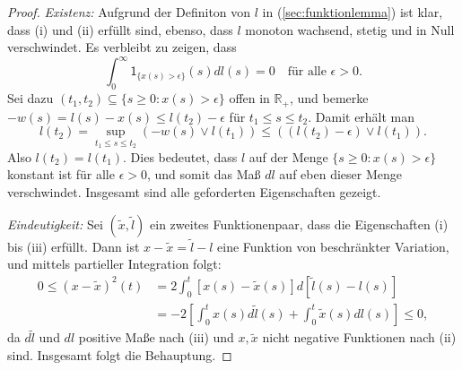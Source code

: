 \documentclass[10pt, a4paper, leqno, twoside, bibliography=totocnumbered, final]{scrartcl}
\theoremstyle{definition}
\theoremstyle{plain}%
\theoremstyle{remark}
\begin{document}
\begin{proof}
\emph{Existenz:} Aufgrund der Definiton von $l$ in (\ref{sec:funktionlemma}) ist klar, dass (i) und (ii) erfüllt sind, ebenso, dass $l$ monoton wachsend, stetig und in Null verschwindet. Es verbleibt zu zeigen, dass
\begin{equation*}
\int_0^{\infty} \mathsf{1}_{\{ x(s) > \epsilon \} }(s) dl(s) = 0 \quad \text{für alle } \epsilon > 0.
\end{equation*}
Sei dazu $(t_1, t_2) \subseteq \{s \geq 0 : x(s) > \epsilon \} $ offen in $ \mathbb{R}_+ $, und bemerke $-w(s) = l(s) - x(s) \leq l(t_2) - \epsilon$ für $ t_1 \leq s \leq t_2$.
Damit erhält man 
\begin{equation*}
l(t_2) = \sup_{t_1 \leq s \leq t_2} \left(  -w(s) \vee l(t_1) \right) \leq \left( ( l(t_2) - \epsilon ) \vee l(t_1) \right) .
\end{equation*}
Also $ l(t_2) = l(t_1) $. Dies bedeutet, dass $l$ auf der Menge $\{s \geq 0 : x(s) > \epsilon \}$ konstant ist für alle $\epsilon > 0$, und somit das Maß $dl$ auf eben dieser Menge verschwindet. Insgesamt sind alle geforderten Eigenschaften gezeigt.

\emph{Eindeutigkeit:} Sei $(\tilde{x}, \tilde{l})$ ein zweites Funktionenpaar, dass die Eigenschaften (i) bis (iii) erfüllt. Dann ist $ x -\tilde{x} = \tilde{l} - l $ eine Funktion von beschränkter Variation, und mittels partieller Integration folgt:
\begin{align*}
0 \leq (x - \tilde{x} )^2 (t) & = 2 \int_0^t [x(s) - \tilde{x}(s)] d[\tilde{l}(s) - l(s)] \\
& = -2 \left[ \int_0^t x(s) d \tilde{l}(s) + \int_0^t \tilde{x}(s) dl(s) \right]  \leq 0,
\end{align*} 
da $d\tilde{l}$ und $dl$ positive Maße nach (iii) und $x, \tilde{x} $ nicht negative Funktionen nach (ii) sind. Insgesamt folgt die Behauptung.
\end{proof}
\end{document}
